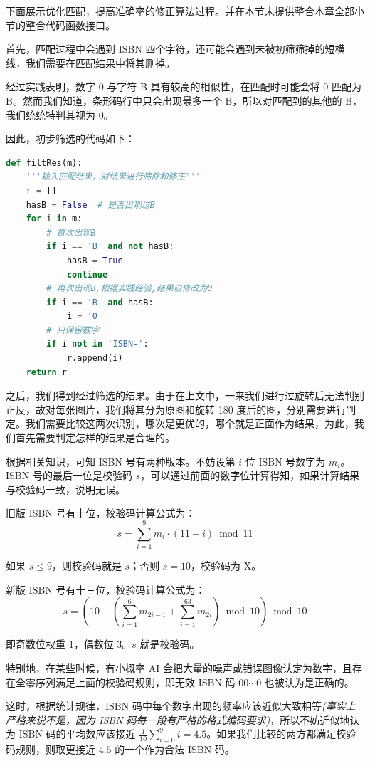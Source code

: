 \documentclass{ctexart}
\begin{document}
下面展示优化匹配，提高准确率的修正算法过程。并在本节末提供整合本章全部小节的整合代码函数接口。

首先，匹配过程中会遇到 ISBN 四个字符，还可能会遇到未被初筛筛掉的短横线，我们需要在匹配结果中将其删掉。

经过实践表明，数字 0 与字符 B 具有较高的相似性，在匹配时可能会将 0 匹配为 B。然而我们知道，条形码行中只会出现最多一个 B，所以对匹配到的其他的 B，我们统统特判其视为 0。

因此，初步筛选的代码如下：
\begin{lstlisting}[language=python]
def filtRes(m):
    '''输入匹配结果，对结果进行筛除和修正'''
    r = []
    hasB = False  # 是否出现过B
    for i in m:
        # 首次出现B
        if i == 'B' and not hasB:
            hasB = True
            continue
        # 再次出现B,根据实践经验,结果应修改为0
        if i == 'B' and hasB:
            i = '0'
        # 只保留数字
        if i not in 'ISBN-':
            r.append(i)
    return r
\end{lstlisting}

之后，我们得到经过筛选的结果。由于在上文中，一来我们进行过旋转后无法判别正反，故对每张图片，我们将其分为原图和旋转 180 度后的图，分别需要进行判定。我们需要比较这两次识别，哪次是更优的，哪个就是正面作为结果，为此，我们首先需要判定怎样的结果是合理的。

根据相关知识，可知 ISBN 号有两种版本。不妨设第 $i$ 位 ISBN 号数字为 $m_i$。ISBN 号的最后一位是校验码 $s$，可以通过前面的数字位计算得知，如果计算结果与校验码一致，说明无误。

旧版 ISBN 号有十位，校验码计算公式为：
\[s=\sum_{i=1}^9m_i\cdot(11-i)\bmod{11}\]

如果 $s\le 9$，则校验码就是 $s$；否则 $s=10$，校验码为 X。

新版 ISBN 号有十三位，校验码计算公式为：
\[s=(10-(\sum_{i=1}^6m_{2i-1}+\sum_{i=1}^63m_{2i})\bmod 10)\bmod{10}\]

即奇数位权重 $1$，偶数位 $3$。$s$ 就是校验码。

特别地，在某些时候，有小概率 AI 会把大量的噪声或错误图像认定为数字，且存在全零序列满足上面的校验码规则，即无效 ISBN 码 $00\cdots 0$ 也被认为是正确的。

这时，根据统计规律，ISBN 码中每个数字出现的频率应该近似大致相等\textit{(事实上严格来说不是，因为 ISBN 码每一段有严格的格式编码要求)}，所以不妨近似地认为 ISBN 码的平均数应该接近 $\frac{1}{10}\sum_{i=0}^9i=4.5$。如果我们比较的两方都满足校验码规则，则取更接近 $4.5$ 的一个作为合法 ISBN 码。
\end{document}
